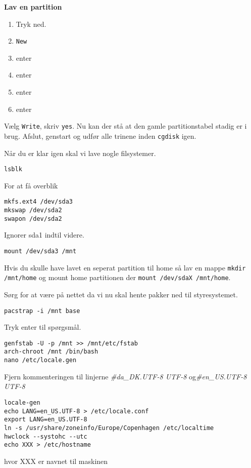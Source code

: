 \documentclass[10pt,a4paper,danish]{article}
\newcommand{\code}[1]{\colorbox{verbgray}{\texttt{#1}}}
\begin{document}
\textbf{Lav en partition}
\begin{enumerate}
\item Tryk ned.
\item \texttt{New}
\item enter
\item enter
\item enter
\item enter
\end{enumerate}

Vælg \texttt{Write}, skriv \texttt{yes}.
Nu kan der stå at den gamle partitionstabel stadig er i brug.
Afslut, genstart og udfør alle trinene inden \texttt{cgdisk} igen.

Når du er klar igen skal vi lave nogle filsystemer.
\begin{verbatim}
lsblk
\end{verbatim}
For at få overblik

\begin{verbatim}
mkfs.ext4 /dev/sda3
mkswap /dev/sda2
swapon /dev/sda2
\end{verbatim}

Ignorer sda1 indtil videre.

\begin{verbatim}
mount /dev/sda3 /mnt
\end{verbatim}

Hvis du skulle have lavet en seperat partition til home så lav en mappe
\code{mkdir /mnt/home} og mount home partitionen der \code{mount /dev/sdaX
  /mnt/home}.

Sørg for at være på nettet da vi nu skal hente pakker ned til styresystemet.
\begin{verbatim}
pacstrap -i /mnt base
\end{verbatim}
Tryk enter til spørgsmål.

\begin{verbatim}
genfstab -U -p /mnt >> /mnt/etc/fstab
arch-chroot /mnt /bin/bash
nano /etc/locale.gen
\end{verbatim}

Fjern kommenteringen til linjerne \textit{\#da\_DK.UTF-8 UTF-8} og\textit{\#en\_US.UTF-8 UTF-8}

\begin{verbatim}
locale-gen
echo LANG=en_US.UTF-8 > /etc/locale.conf
export LANG=en_US.UTF-8
ln -s /usr/share/zoneinfo/Europe/Copenhagen /etc/localtime
hwclock --systohc --utc
echo XXX > /etc/hostname
\end{verbatim}
hvor XXX er navnet til maskinen
\end{document}

